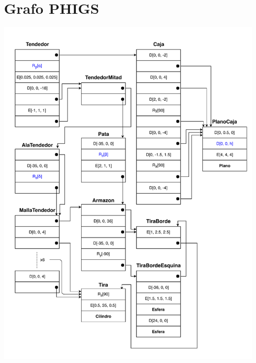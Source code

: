 \documentclass[11pt,a4paper]{article}
\begin{document}
\section*{Grafo PHIGS}
\begin{center}
	\includegraphics[width=45em]{Tendedor.pdf}
\end{center}
\end{document}

